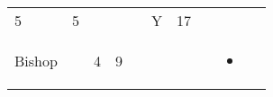 \documentclass[12pt]{article}
\begin{document}
\begin{longtable}[]{@{}llllllllll@{}}
\begin{minipage}[t]{0.06\columnwidth}\raggedright\strut
5
\strut\end{minipage} &
\begin{minipage}[t]{0.06\columnwidth}\raggedright\strut
5
\strut\end{minipage} &
\begin{minipage}[t]{0.06\columnwidth}\raggedright\strut
\strut\end{minipage} &
\begin{minipage}[t]{0.06\columnwidth}\raggedright\strut
\strut\end{minipage} &
\begin{minipage}[t]{0.06\columnwidth}\raggedright\strut
\strut\end{minipage} &
\begin{minipage}[t]{0.07\columnwidth}\raggedright\strut
Y
\strut\end{minipage} &
\begin{minipage}[t]{0.08\columnwidth}\raggedright\strut
17
\strut\end{minipage}\tabularnewline
\begin{minipage}[t]{0.13\columnwidth}\raggedright\strut
Bishop
\strut\end{minipage} &
\begin{minipage}[t]{0.06\columnwidth}\raggedright\strut
\strut\end{minipage} &
\begin{minipage}[t]{0.06\columnwidth}\raggedright\strut
4
\strut\end{minipage} &
\begin{minipage}[t]{0.06\columnwidth}\raggedright\strut
9
\strut\end{minipage} &
\begin{minipage}[t]{0.06\columnwidth}\raggedright\strut
\strut\end{minipage} &
\begin{minipage}[t]{0.06\columnwidth}\raggedright\strut
\strut\end{minipage} &
\begin{minipage}[t]{0.06\columnwidth}\raggedright\strut
\strut\end{minipage} &
\begin{minipage}[t]{0.06\columnwidth}\raggedright\strut
\strut\end{minipage} &
\begin{minipage}[t]{0.07\columnwidth}\raggedright\strut
\begin{itemize}
\item

\end{itemize}
\end{minipage}
\end{longtable}
\end{document}
